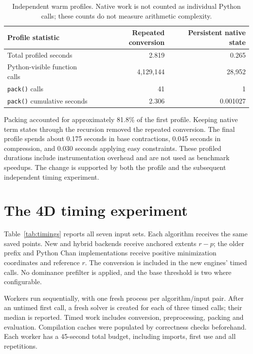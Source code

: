 \documentclass[12pt,a4paper]{article}
\begin{document}
\begin{table}[ht]\centering\small
\begin{tabular}{lrr}\toprule
Profile statistic & Repeated conversion & Persistent native state\\\midrule
Total profiled seconds & 2.819 & 0.265\\
Python-visible function calls & 4,129,144 & 28,952\\
\texttt{pack()} calls & 41 & 1\\
\texttt{pack()} cumulative seconds & 2.306 & 0.001027\\\bottomrule
\end{tabular}
\caption{Independent warm profiles. Native work is not counted as individual
Python calls; these counts do not measure arithmetic complexity.}
\label{tab:profile}
\end{table}

Packing accounted for approximately 81.8\% of the first profile. Keeping
native term states through the recursion removed the repeated conversion.
The final profile spends about 0.175 seconds in base contractions, 0.045
seconds in compression, and 0.030 seconds applying easy constraints.
These profiled durations include instrumentation overhead and are not used
as benchmark speedups. The change is supported by both the profile and the
subsequent independent timing experiment.

\section{The 4D timing experiment}
Table~\ref{tab:timings} reports all seven input sets. Each algorithm receives
the same saved points. New and hybrid backends receive anchored extents $r-p$;
the older prefix and Python Chan implementations receive positive minimization
coordinates and reference $r$. The conversion is included in the new engines'
timed calls. No dominance prefilter is applied, and the base threshold is two
where configurable.

Workers run sequentially, with one fresh process per algorithm/input pair.
After an untimed first call, a fresh solver is created for each of three
timed calls; their median is reported. Timed work includes conversion,
preprocessing, packing and evaluation. Compilation caches were populated by
correctness checks beforehand. Each worker has a 45-second total budget,
including imports, first use and all repetitions.
\end{document}
